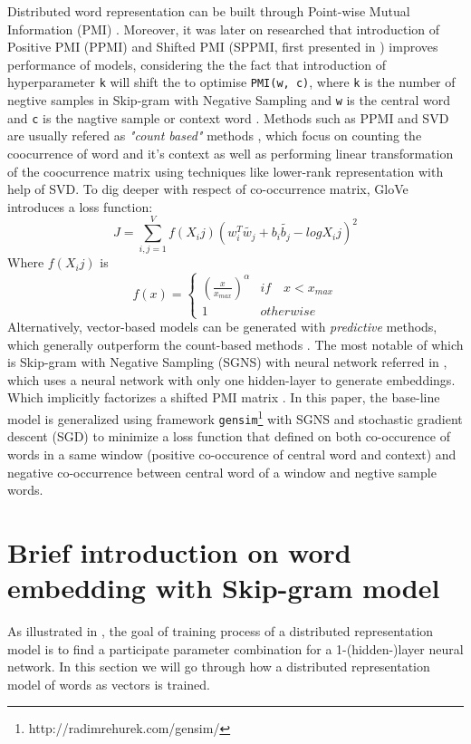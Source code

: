 \documentclass[11pt,a4paper]{article}
\begin{document}
Distributed word representation can be built through Point-wise Mutual Information (PMI) \cite{church1990word}. Moreover, it was later on researched that introduction of Positive PMI (PPMI) \cite{bullinaria2007extracting} and Shifted PMI (SPPMI, first presented in \cite{goldberg2014word2vec}) improves performance of models, considering the the fact that introduction of hyperparameter \verb|k| will shift the to optimise \verb|PMI(w, c)|, where \verb|k| is the number of negtive samples in Skip-gram with Negative Sampling and \verb|w| is the central word and \verb|c| is the nagtive sample or context word \cite{levy2014neural}. Methods such as PPMI and SVD are usually refered as \emph{"count based"} methods \cite{levy2015improving}, which focus on counting the coocurrence of word and it's context as well as performing linear transformation of the coocurrence matrix using techniques like lower-rank representation with help of SVD. To dig deeper with respect of co-occurrence matrix, GloVe \cite{Pennington2014glove} introduces a loss function:
\begin{equation}
J=\sum_{i,j=1}^{V}f(X_ij)(w_i^T\tilde{w_j}+b_i\tilde{b_j}-logX_ij)^2
\end{equation}
Where $f(X_ij)$ is
\begin{equation} 
  f(x)=\left\{
    \begin{array}{rl}
    (\frac{x}{x_{max}})^\alpha & if\quad x<x_{max}\\
    1 & otherwise
    \end{array}
\right.
\end{equation}
Alternatively, vector-based models can be generated with \emph{predictive} methods, which generally outperform the count-based methods \cite{levy2015improving}. The most notable of which is Skip-gram with Negative Sampling (SGNS) with neural network referred in \cite{mikolov2013distributed}, which uses a neural network with only one hidden-layer to generate embeddings. Which implicitly factorizes a shifted PMI matrix \cite{levy2014neural}. In this paper, the base-line model is generalized using framework \verb|gensim|\footnote{http://radimrehurek.com/gensim/} with SGNS and stochastic gradient descent (SGD) to minimize a loss function that defined on both co-occurence of words in a same window (positive co-occurence of central word and context) and negative co-occurrence between central word of a window and negtive sample words. 

\section{Brief introduction on word embedding with Skip-gram model}
As illustrated in \cite{mikolov2013distributed}, the goal of training process of a distributed representation model is to find a participate parameter combination for a 1-(hidden-)layer neural network. In this section we will go through how a distributed representation model of words as vectors is trained.
\end{document}

